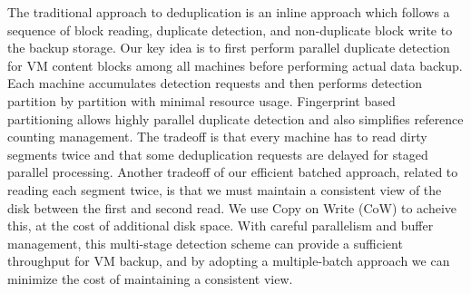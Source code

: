 The traditional approach to  deduplication is an inline approach which follows
a sequence of block reading, duplicate detection,  and non-duplicate  block write to the 
backup storage.  
Our key idea  is to  first perform parallel duplicate detection for VM content blocks 
among all machines before performing actual data backup. Each machine
accumulates detection requests and  then performs detection   partition by partition 
with minimal resource usage.
Fingerprint based partitioning allows highly parallel duplicate detection  and also simplifies 
reference counting management.  
The tradeoff is that every machine has to read dirty segments twice
and that some deduplication requests are delayed for staged parallel processing.
Another tradeoff of our efficient batched approach, related to reading each
segment twice, is that we must maintain a consistent view of the disk between
the first and second read. We use Copy on Write (CoW) to acheive this, at the
cost of additional disk space.
With careful parallelism and buffer  management,
this multi-stage detection scheme can provide  a sufficient throughput for VM
backup, and by adopting a multiple-batch approach we can minimize the cost
of maintaining a consistent view.










